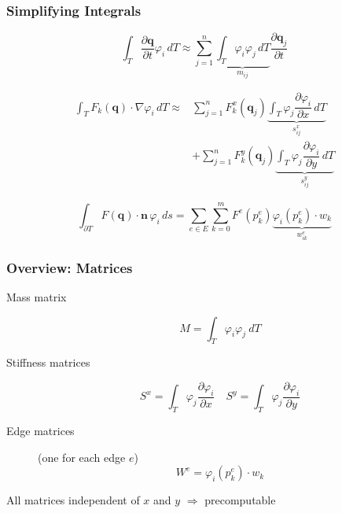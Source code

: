\documentclass{beamer}
\newcommand{\todo}[1]{
  \textcolor{red}{TODO: #1}
  \note{\textcolor{red}{TODO: #1}}
}
\renewcommand{\todo}[1]{}
\newcommand{\pd}[2]{\dfrac{\partial #1}{\partial #2}}
\renewcommand{\phi}{\varphi}
\begin{document}
\begin{frame}
  \frametitle{Simplifying Integrals}
  \todo{Sollen wir diese Folie vielleicht rauslassen?}
  \begin{equation*}
    \label{sec:first-integral}
    \int_T \pd {\mathbf{q}}{t} \phi_i \, dT \approx \sum_{j=1}^n \underbrace{\int_T \phi_i \phi_j \, dT}_{m_{ij}} \pd{\mathbf{q}_j}{t}
  \end{equation*}
  
  \begin{eqnarray*}
    \label{sec:third-integral}
    \int_T F_k(\mathbf{q}) \cdot \nabla \phi_i \, dT \approx &
    \sum_{j=1}^n F_k^x\left(\mathbf{q}_j\right) \underbrace{\int_T \phi_j \pd{\phi_i}{x} \, dT}_{s^x_{ij}} \\
    {} & + \sum_{j=1}^n F_k^y\left(\mathbf{q}_j\right) \underbrace{\int_T \phi_j \pd{\phi_i}{y} \, dT}_{s^y_{ij}}
  \end{eqnarray*}

  \begin{equation}
    \label{eq:second-integral}
    \int_{\partial T} F(\mathbf{q}) \cdot \mathbf{n} \, \phi_i \, ds = \sum_{e \in E} \sum_{k=0}^{m} F^e(p_k^e) \underbrace{\phi_i(p_k^e) \cdot w_k}_{w_{ik}^e}
  \end{equation}
\end{frame}

\begin{frame}
  \frametitle{Overview: Matrices}
  \begin{description}
  \item[Mass matrix]
    \begin{equation}
      \label{eq:mass-matrix-overview}
      M = \int_T \phi_i \phi_j \ dT
    \end{equation}
  \item[Stiffness matrices]
    \begin{equation}
      \label{eq:stiffness-matrix-overview}
      S^x = \int_T \phi_j \pd{\phi_i}{x} \quad
      S^y = \int_T \phi_j \pd{\phi_i}{y}
    \end{equation}
  \item[Edge matrices] (one for each edge $e$) %
    \begin{equation}
      \label{eq:edge-matrices}
      W^e = \phi_i\left(p_k^e\right) \cdot w_k
    \end{equation}
  \end{description}

  All matrices independent of $x$ and $y$ $\Rightarrow$ precomputable
\end{frame}
\end{document}
